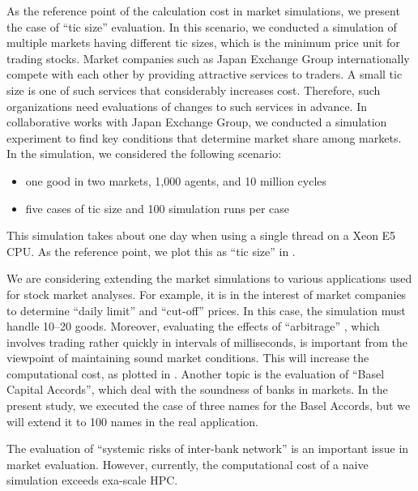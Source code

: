 As the reference point of the calculation cost in market simulations,
we present the case of ``tic size'' evaluation.
In this scenario, we conducted a simulation of multiple markets
having different tic sizes,
which is the minimum price unit for trading stocks.
Market companies such as Japan Exchange Group internationally compete
with each other by providing attractive services to traders.
A small tic size
is one of such services that  considerably increases cost.
Therefore, such organizations need evaluations of changes to such services in advance.
In collaborative works with Japan Exchange Group, we conducted a
simulation experiment to find key conditions that determine market share
among markets.
In the simulation, we considered the following scenario:
\begin{itemize}
  \item one good in two markets, 1,000 agents, and 10 million cycles
  \item five cases of tic size and 100 simulation runs per case
\end{itemize}
This simulation takes about one day when using a single thread on a Xeon E5 CPU.
As the reference point, we plot this as ``tic size'' in .

We are considering extending the market simulations to various
applications used for stock market analyses.
For example, it is in the interest of market companies 
to determine ``daily limit'' and ``cut-off'' prices\cite{Mizuta2013a}.
In this case, the simulation must handle 10--20 goods.
Moreover, evaluating the effects of ``arbitrage'' \cite{Kawakubo2014a}, 
which involves trading rather quickly in intervals of milliseconds,
is important from the viewpoint of maintaining sound market conditions.
This will increase the computational cost, as plotted in .
Another topic is the evaluation of ``Basel Capital Accords'',
which deal with the soundness of banks in markets.
In the present study, we executed the case of three names for the Basel Accords,
but we will extend it to 100 names in the real application.

The evaluation of ``systemic risks of inter-bank network'' is an important issue
in market evaluation.
However, currently, the 
computational cost of a naive simulation exceeds exa-scale HPC.


